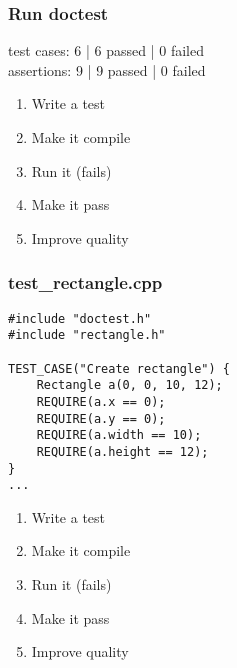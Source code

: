 \begin{frame}[fragile]
\frametitle{Run doctest}
\begin{minipage}[t]{0.48\linewidth}
test cases: 6 | 6 passed | 0 failed\\
assertions: 9 | 9 passed | 0 failed\\
\end{minipage}\hfill
\begin{minipage}[t]{0.28\linewidth}
  \small
  \begin{enumerate} 
    \item \textcolor{activecolor}{Write a test}
    \item \textcolor{deadcolor}{Make it compile}
    \item \textcolor{deadcolor}{Run it (fails)}
    \item \textcolor{deadcolor}{Make it pass}
    \item \textcolor{deadcolor}{Improve quality}
  \end{enumerate} 
\end{minipage}
\end{frame}


\begin{frame}[fragile]
\frametitle{test\_rectangle.cpp}
\begin{minipage}[t]{0.48\linewidth}
\begin{lstlisting}
#include "doctest.h"
#include "rectangle.h"

TEST_CASE("Create rectangle") {
    Rectangle a(0, 0, 10, 12);
    REQUIRE(a.x == 0);
    REQUIRE(a.y == 0);
    REQUIRE(a.width == 10);
    REQUIRE(a.height == 12);
}
...
\end{lstlisting}
\end{minipage}\hfill
\begin{minipage}[t]{0.28\linewidth}
  \small
  \begin{enumerate} 
    \item \textcolor{activecolor}{Write a test}
    \item \textcolor{deadcolor}{Make it compile}
    \item \textcolor{deadcolor}{Run it (fails)}
    \item \textcolor{deadcolor}{Make it pass}
    \item \textcolor{deadcolor}{Improve quality}
  \end{enumerate} 
\end{minipage}
\end{frame}

